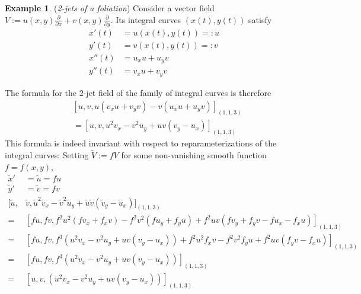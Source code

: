 \documentclass[12pt]{article}
\numberwithin{equation}{section}
\theoremstyle{plain}
\theoremstyle{definition}
\newtheorem{example}[definition]{Example}
\renewcommand{\P}{\mathbb{P}}
\begin{document}
\begin{example} (\emph{2-jets of a foliation})
Consider a vector field $V:=u(x,y)\tfrac{\partial}{\partial x}+v(x,y)\tfrac{\partial}{\partial y}$. Its integral curves $(x(t),y(t))$ satisfy
\begin{align*}
x'(t)&=u(x(t),y(t))=:u\\
y'(t)&=v(x(t),y(t))=:v\\
x''(t)&=u_{x}u+u_{y}v\\
y''(t)&=v_{x}u+v_{y}v
\end{align*}
\end{example}
The formula for the $2$-jet field of the family of integral curves is therefore
\begin{align*}
&[u,v,u(v_{x}u+v_{y}v)-v(u_{x}u+u_{y}v)]_{(1,1,3)}\\
&=[u,v,u^{2}v_{x}-v^{2}u_{y}+uv(v_{y}-u_{x})]_{(1,1,3)}
\end{align*}
This formula is indeed invariant with respect to reparameterizations of the integral curves: Setting $\tilde{V}:=fV$ for some non-vanishing smooth function $f=f(x,y)$,
\begin{align*}
\tilde{x}'&=\tilde{u}=fu\\
\tilde{y}'&=\tilde{v}=fv\\
[\tilde{u},&\tilde{v},\tilde{u}^{2}\tilde{v}_{x}-\tilde{v}^{2}\tilde{u}_{y}+\tilde{u}\tilde{v}(\tilde{v}_{y}-\tilde{u}_{x})]_{(1,1,3)}\\
=&[fu,fv,f^{2}u^{2}(fv_{x}+f_{x}v)-f^{2}v^{2}(fu_{y}+f_{y}u)+f^{2}uv(fv_{y}+f_{y}v-fu_{x}-f_{x}u)]_{(1,1,3)}\\
=&[fu,fv,f^{3}(u^{2}v_{x}-v^{2}u_{y}+uv(v_{y}-u_{x}))+f^{2}u^{2}f_{x}v-f^{2}v^{2}f_{y}u+f^{2}uv(f_{y}v-f_{x}u)]_{(1,1,3)}\\
=&[fu,fv,f^{3}(u^{2}v_{x}-v^{2}u_{y}+uv(v_{y}-u_{x}))]_{(1,1,3)}\\
=&[u,v,(u^{2}v_{x}-v^{2}u_{y}+uv(v_{y}-u_{x}))]_{(1,1,3)}
\end{align*}
\end{document}
